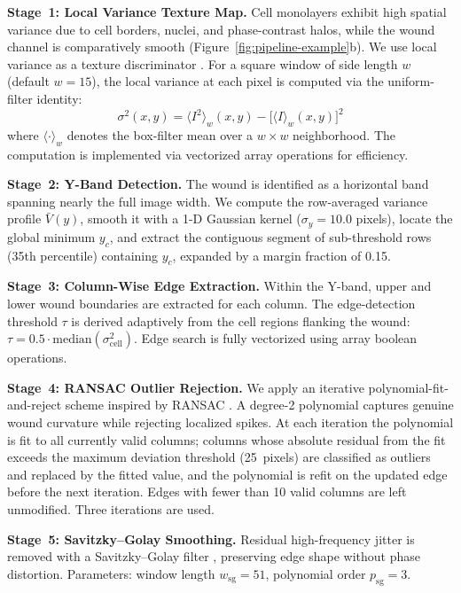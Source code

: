 \textbf{Stage~1: Local Variance Texture Map.}
Cell monolayers exhibit high spatial variance due to cell borders, nuclei, and phase-contrast
halos, while the wound channel is comparatively smooth \citep{Yin2012} (Figure~\ref{fig:pipeline-example}b).
We use local variance as a texture discriminator \citep{Koenig2017,Loizou2016,Ambrossio2022}.
For a square window of side length $w$ (default $w = 15$), the local variance at each pixel
is computed via the uniform-filter identity:
\begin{equation}
	\sigma^2(x, y) = \langle I^2 \rangle_w(x, y) - \bigl[\langle I \rangle_w(x, y)\bigr]^2
	\label{eq:local-variance}
\end{equation}
where $\langle \cdot \rangle_w$ denotes the box-filter mean over a $w \times w$ neighborhood.
The computation is implemented via vectorized array operations for efficiency.

\textbf{Stage~2: Y-Band Detection.}
The wound is identified as a horizontal band spanning nearly the full image width.
We compute the row-averaged variance profile $\bar{V}(y)$, smooth it with a 1-D Gaussian
kernel ($\sigma_y = 10.0$ pixels), locate the global minimum $y_c$, and extract the
contiguous segment of sub-threshold rows (35th percentile) containing $y_c$,
expanded by a margin fraction of 0.15.

\textbf{Stage~3: Column-Wise Edge Extraction.}
Within the Y-band, upper and lower wound boundaries are extracted for each column.
The edge-detection threshold $\tau$ is derived adaptively from the cell regions flanking the
wound: $\tau = 0.5 \cdot \text{median}(\sigma^2_\text{cell})$.
Edge search is fully vectorized using array boolean operations.

\textbf{Stage~4: RANSAC Outlier Rejection.}
We apply an iterative polynomial-fit-and-reject scheme inspired by RANSAC
\citep{Fischler1981}.
A degree-2 polynomial captures genuine wound curvature while rejecting localized spikes.
At each iteration the polynomial is fit to all currently valid columns; columns whose
absolute residual from the fit exceeds the maximum deviation threshold (25~pixels) are
classified as outliers and replaced by the fitted value, and the polynomial is refit on
the updated edge before the next iteration. Edges with fewer than 10 valid columns are
left unmodified. Three iterations are used.

\textbf{Stage~5: Savitzky--Golay Smoothing.}
Residual high-frequency jitter is removed with a Savitzky--Golay filter \citep{Savitzky1964},
preserving edge shape without phase distortion.
Parameters: window length $w_\text{sg} = 51$, polynomial order $p_\text{sg} = 3$.

